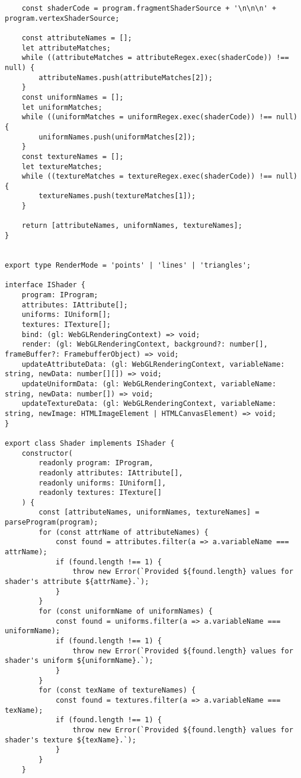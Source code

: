 \begin{lstlisting}
    const shaderCode = program.fragmentShaderSource + '\n\n\n' + program.vertexShaderSource;

    const attributeNames = [];
    let attributeMatches;
    while ((attributeMatches = attributeRegex.exec(shaderCode)) !== null) {
        attributeNames.push(attributeMatches[2]);
    }
    const uniformNames = [];
    let uniformMatches;
    while ((uniformMatches = uniformRegex.exec(shaderCode)) !== null) {
        uniformNames.push(uniformMatches[2]);
    }
    const textureNames = [];
    let textureMatches;
    while ((textureMatches = textureRegex.exec(shaderCode)) !== null) {
        textureNames.push(textureMatches[1]);
    }

    return [attributeNames, uniformNames, textureNames];
}


export type RenderMode = 'points' | 'lines' | 'triangles';

interface IShader {
    program: IProgram;
    attributes: IAttribute[];
    uniforms: IUniform[];
    textures: ITexture[];
    bind: (gl: WebGLRenderingContext) => void;
    render: (gl: WebGLRenderingContext, background?: number[], frameBuffer?: FramebufferObject) => void;
    updateAttributeData: (gl: WebGLRenderingContext, variableName: string, newData: number[][]) => void;
    updateUniformData: (gl: WebGLRenderingContext, variableName: string, newData: number[]) => void;
    updateTextureData: (gl: WebGLRenderingContext, variableName: string, newImage: HTMLImageElement | HTMLCanvasElement) => void;
}

export class Shader implements IShader {
    constructor(
        readonly program: IProgram,
        readonly attributes: IAttribute[],
        readonly uniforms: IUniform[],
        readonly textures: ITexture[]
    ) {
        const [attributeNames, uniformNames, textureNames] = parseProgram(program);
        for (const attrName of attributeNames) {
            const found = attributes.filter(a => a.variableName === attrName);
            if (found.length !== 1) {
                throw new Error(`Provided ${found.length} values for shader's attribute ${attrName}.`);
            }
        }
        for (const uniformName of uniformNames) {
            const found = uniforms.filter(a => a.variableName === uniformName);
            if (found.length !== 1) {
                throw new Error(`Provided ${found.length} values for shader's uniform ${uniformName}.`);
            }
        }
        for (const texName of textureNames) {
            const found = textures.filter(a => a.variableName === texName);
            if (found.length !== 1) {
                throw new Error(`Provided ${found.length} values for shader's texture ${texName}.`);
            }
        }
    }


\end{lstlisting}

